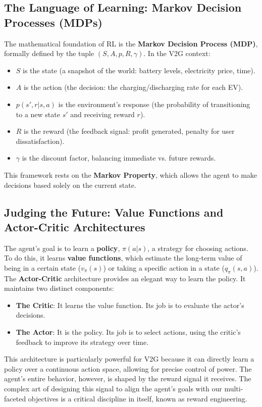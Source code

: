 \subsection{The Language of Learning: Markov Decision Processes (MDPs)}
The mathematical foundation of RL is the \textbf{Markov Decision Process (MDP)}, formally defined by the tuple $(S, A, p, R, \gamma)$. In the V2G context:
\begin{itemize}
    \item $S$ is the state (a snapshot of the world: battery levels, electricity price, time).
    \item $A$ is the action (the decision: the charging/discharging rate for each EV).
    \item $p(s',r|s,a)$ is the environment's response (the probability of transitioning to a new state $s'$ and receiving reward $r$).
    \item $R$ is the reward (the feedback signal: profit generated, penalty for user dissatisfaction).
    \item $\gamma$ is the discount factor, balancing immediate vs. future rewards.
\end{itemize}
This framework rests on the \textbf{Markov Property}, which allows the agent to make decisions based solely on the current state.

\subsection{Judging the Future: Value Functions and Actor-Critic Architectures}
The agent's goal is to learn a \textbf{policy}, $\pi(a|s)$, a strategy for choosing actions. To do this, it learns \textbf{value functions}, which estimate the long-term value of being in a certain state ($v_{\pi}(s)$) or taking a specific action in a state ($q_{\pi}(s, a)$).
\\
\noindent
The \textbf{Actor-Critic} architecture provides an elegant way to learn the policy. It maintains two distinct components:
\begin{itemize}
    \item \textbf{The Critic}: It learns the value function. Its job is to evaluate the actor's decisions.
    \item \textbf{The Actor}: It is the policy. Its job is to select actions, using the critic's feedback to improve its strategy over time.
\end{itemize}
This architecture is particularly powerful for V2G because it can directly learn a policy over a continuous action space, allowing for precise control of power. The agent's entire behavior, however, is shaped by the reward signal it receives. The complex art of designing this signal to align the agent's goals with our multi-faceted objectives is a critical discipline in itself, known as reward engineering.


